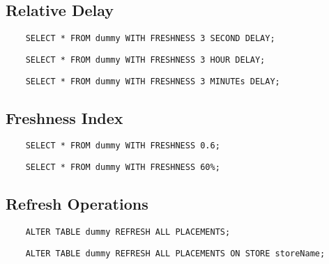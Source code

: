 \tocless\subsection{Relative Delay}

\begin{verbatim}
    SELECT * FROM dummy WITH FRESHNESS 3 SECOND DELAY;
\end{verbatim}

\begin{verbatim}
    SELECT * FROM dummy WITH FRESHNESS 3 HOUR DELAY;
\end{verbatim}

\begin{verbatim}
    SELECT * FROM dummy WITH FRESHNESS 3 MINUTEs DELAY;
\end{verbatim}



\tocless\subsection{Freshness Index}

\begin{verbatim}
    SELECT * FROM dummy WITH FRESHNESS 0.6;
\end{verbatim}

\begin{verbatim}
    SELECT * FROM dummy WITH FRESHNESS 60%;
\end{verbatim}



\tocless\subsection{Refresh Operations}

\begin{verbatim}
    ALTER TABLE dummy REFRESH ALL PLACEMENTS;
\end{verbatim}

\begin{verbatim}
    ALTER TABLE dummy REFRESH ALL PLACEMENTS ON STORE storeName;
\end{verbatim}
